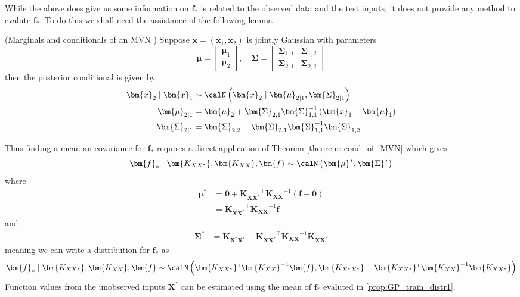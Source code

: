 While the above does give us some information on $\bm{f}_{\ast}$ is related to the observed data and the test inputs, it does not provide any method to evalute $\bm{f}_{\ast}$. To do this we shall need the assistance of the following lemma
\begin{thm}\label{theorem: cond_of_MVN}
    (Marginals and conditionals of an MVN \cite{MurphyKevinP2012Ml}) Suppose $\bm{x} = (\bm{x}_1, \bm{x}_2)$ is jointly Gaussian with parameters
    \[
        \bm{\mu} =
        \begin{bmatrix}
            \bm{\mu}_1 \\
            \bm{\mu}_2
        \end{bmatrix}, \quad
        \bm{\Sigma} =
        \begin{bmatrix}
            \bm{\Sigma}_{1,1} & \bm{\Sigma}_{1,2} \\
            \bm{\Sigma}_{2,1} & \bm{\Sigma}_{2,2}
        \end{bmatrix}
    \]
    then the posterior conditional is given by
    \begin{align*}
        \bm{x}_2 \mid \bm{x}_1 & \sim \calN \left( \bm{x}_2 \mid \bm{\mu}_{2 \mid 1}, \bm{\Sigma}_{2 \mid 1} \right)          \\
        \bm{\mu}_{2 \mid 1}    & = \bm{\mu}_2 + \bm{\Sigma}_{2,1} \bm{\Sigma}_{1,1}^{-1} \left( \bm{x}_1 - \bm{\mu}_1 \right) \\
        \bm{\Sigma}_{2 \mid 1} & = \bm{\Sigma}_{2,2} - \bm{\Sigma}_{2,1} \bm{\Sigma}_{1,1}^{-1} \bm{\Sigma}_{1,2}
    \end{align*}
\end{thm}

Thus finding a mean an covariance for $\bm{f}_{\ast}$ requires a direct application of Theorem \ref{theorem: cond_of_MVN} which gives
\begin{align*}
    \bm{f}_{\ast} \mid \bm{K_{XX^{\ast}}} , \bm{K_{XX}}, \bm{f} \sim \calN \left( \bm{\mu}^{\ast}, \bm{\Sigma}^{\ast} \right)
\end{align*}
where
\begin{align*}
    \bm{\mu}^{\ast} & = \bm{0} + \bm{K_{XX^{\ast}}}^{\intercal} \bm{K_{XX}}^{-1} \left( \bm{f} - \bm{0} \right) \\
                    & = \bm{K_{XX^{\ast}}}^{\intercal} \bm{K_{XX}}^{-1} \bm{f}
\end{align*}
and
\begin{align*}
    \bm{\Sigma}^{\ast} & = \bm{K_{X^{\ast}X^{\ast}}} - \bm{K_{XX^{\ast}}}^{\intercal} \bm{K_{XX}}^{-1} \bm{K_{XX^{\ast}}}
\end{align*}
meaning we can write a distribution for $\bm{f}_{\ast}$ as
\begin{equation}\label{prop:GP_train_distr1}
    \bm{f}_{\ast} \mid \bm{K_{XX^{\ast}}} , \bm{K_{XX}}, \bm{f} \sim \calN \left( \bm{K_{XX^{\ast}}}^{\intercal} \bm{K_{XX}}^{-1} \bm{f},  \bm{K_{X^{\ast}X^{\ast}}} - \bm{K_{XX^{\ast}}}^{\intercal} \bm{K_{XX}}^{-1} \bm{K_{XX^{\ast}}}  \right)
\end{equation}
Function values from the unobserved inputs $\bm{X^{\ast}}$ can be estimated using the mean of $\bm{f}_{\ast}$ evaluted in \ref{prop:GP_train_distr1}.

